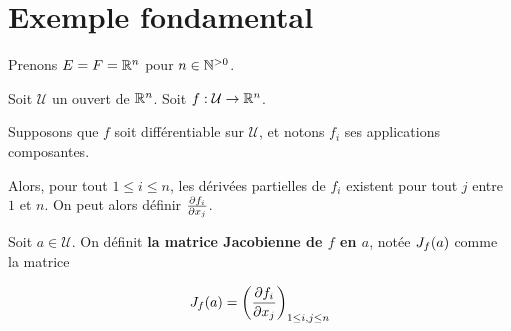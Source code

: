 \section{Exemple fondamental}


Prenons $E = F = \mathbb{R}^{n}$ pour $n \in \mathbb{N}^{> 0}$.

Soit $\mathcal{U}$ un ouvert de $\mathbb{R}^{n}$.
Soit $f : \mathcal{U} \rightarrow \mathbb{R}^{n}$.

Supposons que $f$ soit différentiable sur $\mathcal{U}$, et notons $f_{i}$ ses
applications composantes.

Alors, pour tout $1 \leq i \leq n$, les dérivées partielles de $f_{i}$ existent pour
tout $j$ entre $1$ et $n$. On peut alors définir $\pdv{f_{i}}{x_{j}}$.

\begin{definition}
	Soit $a \in \mathcal{U}$.
	On définit \textbf{la matrice Jacobienne de $f$ en $a$}, notée
	$J_{f}(a)$ comme la matrice

	\begin{equation*}
		J_{f}(a) = \left(\pdv{f_{i}}{x_{j}} (a) \right)_{1 \leq i, j \leq n}
	\end{equation*}
\end{definition}
